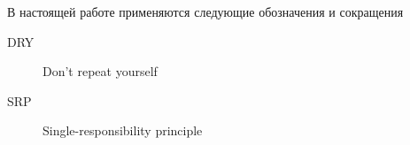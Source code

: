 
\Abbreviations %
В настоящей работе применяются следующие обозначения и сокращения 
\begin{description}
\item[DRY] Don’t repeat yourself
\item[SRP] Single-responsibility principle
   
\end{description}
